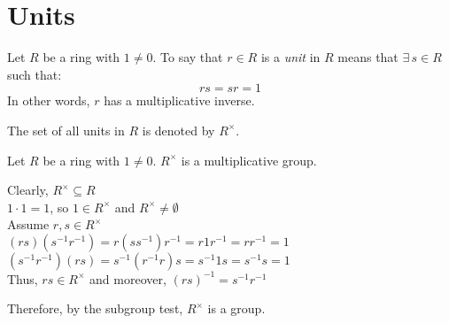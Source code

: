 \documentclass[letterpaper,12pt,fleqn]{article}
\newcommand{\x}{\times}
\newcommand{\Rx}{R^{\x}}
\begin{document}
\section*{Units}

\begin{definition}[Unit]
  Let $R$ be a ring with $1\ne0$. To say that $r\in R$ is a \emph{unit} in $R$ means that
  $\exists\,s\in R$ such that:
  \[rs=sr=1\]
  In other words, $r$ has a multiplicative inverse.

  The set of all units in $R$ is denoted by $\Rx$.
\end{definition}

\begin{theorem}
  Let $R$ be a ring with $1\ne0$. $\Rx$ is a multiplicative group.
\end{theorem}

\begin{theproof}
  Clearly, $\Rx\subseteq R$ \\
  $1\cdot1=1$, so $1\in\Rx$ and $\Rx\ne\emptyset$ \\
  Assume $r,s\in\Rx$ \\
  $(rs)(s^{-1}r^{-1})=r(ss^{-1})r^{-1}=r1r^{-1}=rr^{-1}=1$ \\
  $(s^{-1}r^{-1})(rs)=s^{-1}(r^{-1}r)s=s^{-1}1s=s^{-1}s=1$ \\
  Thus, $rs\in\Rx$ and moreover, $(rs)^{-1}=s^{-1}r^{-1}$

  Therefore, by the subgroup test, $\Rx$ is a group.
\end{theproof}
\end{document}
